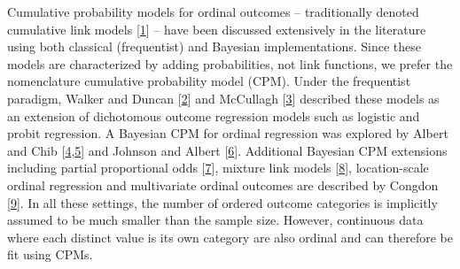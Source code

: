 \documentclass[
]{article}
\begin{document}
Cumulative probability models for ordinal outcomes -- traditionally denoted cumulative link models {[}\protect\hyperlink{ref-agresti_categorical_2002}{1}{]} -- have been discussed extensively in the literature using both classical (frequentist) and Bayesian implementations. Since these models are characterized by adding probabilities, not link functions, we prefer the nomenclature cumulative probability model (CPM). Under the frequentist paradigm, Walker and Duncan {[}\protect\hyperlink{ref-walker_estimation_1967}{2}{]} and McCullagh {[}\protect\hyperlink{ref-peter_mccullagh_regression_1980}{3}{]} described these models as an extension of dichotomous outcome regression models such as logistic and probit regression. A Bayesian CPM for ordinal regression was explored by Albert and Chib {[}\protect\hyperlink{ref-albert_bayesian_1993}{4},\protect\hyperlink{ref-albert_bayesian_1997}{5}{]} and Johnson and Albert {[}\protect\hyperlink{ref-johnson_ordinal_1999}{6}{]}. Additional Bayesian CPM extensions including partial proportional odds {[}\protect\hyperlink{ref-peterson_partial_1990}{7}{]}, mixture link models {[}\protect\hyperlink{ref-lang_bayesian_1999}{8}{]}, location-scale ordinal regression and multivariate ordinal outcomes are described by Congdon {[}\protect\hyperlink{ref-congdon_bayesian_2005}{9}{]}. In all these settings, the number of ordered outcome categories is implicitly assumed to be much smaller than the sample size. However, continuous data where each distinct value is its own category are also ordinal and can therefore be fit using CPMs.
\end{document}
